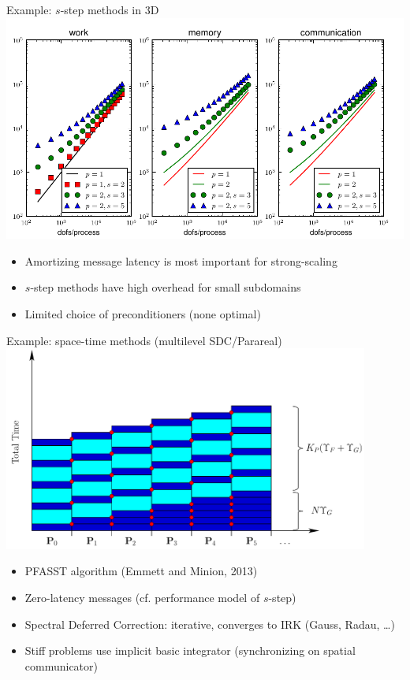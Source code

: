 \documentclass{beamer}
\begin{document}
\begin{frame}{Example: $s$-step methods in 3D}
  \includegraphics[width=1.1\textwidth]{figures/SStepEfficiency.pdf}
  \begin{itemize}
  \item Amortizing message latency is most important for strong-scaling
  \item $s$-step methods have high overhead for small subdomains
  \item Limited choice of preconditioners (none optimal)
  \end{itemize}
\end{frame}

\begin{frame}{Example: space-time methods (multilevel SDC/Parareal)}
  \includegraphics[width=0.9\textwidth]{figures/EmmettMinionPFASSTCost.png}
  \begin{itemize}
  \item PFASST algorithm (Emmett and Minion, 2013)
  \item Zero-latency messages (cf. performance model of $s$-step)
  \item Spectral Deferred Correction: iterative, converges to IRK (Gauss, Radau, \ldots)
  \item Stiff problems use implicit basic integrator (synchronizing on spatial communicator)
  \end{itemize}
\end{frame}
\end{document}
